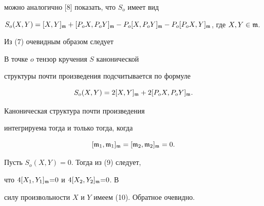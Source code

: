 можно аналогично [8] показать, что $S_o$ имеет вид


$S_o(X,Y)=[X,Y]_{\frak{m}}+[P_oX,P_oY]_{\frak{m}}-P_o[X,P_oY]_{\frak{m}}-


P_o[P_oX,Y]_{\frak{m}}$, где $X,Y \in \frak{m}$.





Из (7) очевидным образом следует





\begin{lem}


В точке $o$ тензор кручения $S$ канонической


структуры почти произведения подсчитывается по формуле


\begin{equation}\label{9}


S_o(X,Y)=2[X,Y]_{\frak{m}}+2[P_oX,P_oY]_{\frak{m}}.


\end{equation}


\end{lem}





\begin{thm}


Каноническая структура почти произведения


интегрируема тогда и только тогда, когда


\begin{equation}\label{10}


[\frak{m}_1,\frak{m}_1]_{\frak{m}}=[\frak{m}_2,\frak{m}_2]_{\frak{m}}=0.


\end{equation}


\end{thm}





\begin{pf}


Пусть $S_o(X,Y){=}0$. Тогда из (9) следует,


что $4[X_1,Y_1]_{\frak{m}}{=}0$ и $4[X_2,Y_2]_{\frak{m}}{=}0$. В


силу произвольности $X$ и $Y$ имеем (10). Обратное очевидно.


\end{pf}





